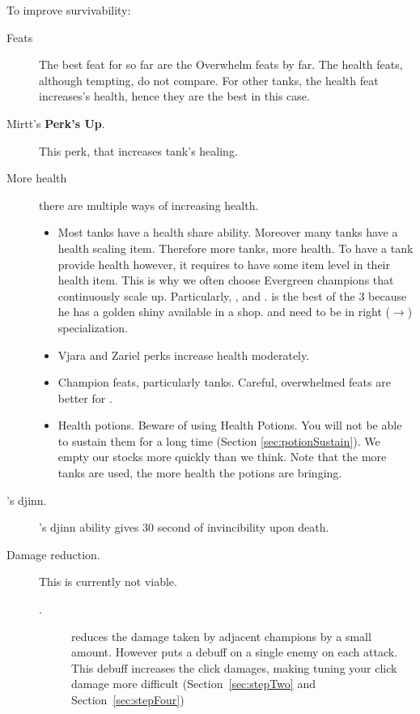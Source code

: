 \documentclass{article}
\begin{document}
To improve survivability:
\begin{description}
    \item[Feats] The best feat for \briv so far are the Overwhelm feats by far.
    The health feats, although tempting, do not compare.
    For other tanks, the health feat increases\briv's health, hence they are the best in this case.
    \item[Mirtt's \textbf{Perk's Up}.] This perk, that increases tank's healing.
    \item[More health] there are multiple ways of increasing health.
        \begin{itemize}
            \item Most tanks have a health share ability.
            Moreover many tanks have a health scaling item.
            Therefore more tanks, more health.
            To have a tank provide health however, it requires to have some item level in their health item.
            This is why we often choose Evergreen champions that continuously scale up.
            Particularly, \dragonbait, \tyril and \nayeli.
            \dragonbait is the best of the 3 because he has a golden shiny available in a \stradh shop.
            \tyril and \nayeli need to be in right ($\rightarrow$) specialization.
            \item Vjara and Zariel perks increase health moderately.
            \item Champion feats, particularly tanks.
            Careful, overwhelmed feats are better for \briv.
             \item Health potions.
            Beware of using Health Potions.
            You will not be able to sustain them for a long time (Section \ref{sec:potionSustain}).
            We empty our stocks more quickly than we think.
            Note that the more tanks are used, the more health the potions are bringing.
        \end{itemize}
    \item[\baeloth's djinn.] \baeloth's djinn ability gives 30 second of invincibility upon death.
    \item[Damage reduction.] This is currently not viable.
    \begin{description}
    \item[\yorven.]
    \yorven reduces the damage taken by adjacent champions by a small amount.
    However \yorven puts a debuff on a single enemy on each attack.
    This debuff increases the click damages, making tuning your click damage more difficult (Section~\ref{sec:stepTwo} and Section~\ref{sec:stepFour})

\end{description}
\end{description}
\end{document}
